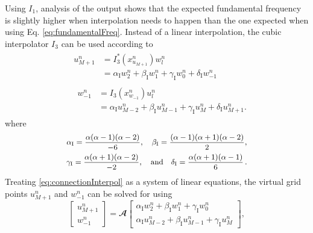 \documentclass[dvipsnames, reprint]{JASA}
\begin{document}
Using $I_1$, analysis of the output shows that the expected fundamental frequency is slightly higher when interpolation needs to happen than the one expected when using Eq. \eqref{eq:fundamentalFreq}. Instead of a linear interpolation, the cubic interpolator $I_3$ can be used according to 
\begin{subequations}\label{eq:connectionInterpol}
\begin{align}
    &\begin{aligned}\label{eq:calcUMP1}
        u_{M+1}^n &= I_3^*(x^n_{u_{M+1}})w_l^n\\
        &= \alpha_\text{I}w_2^n + \beta_\text{I}w_1^n + \gamma_\text{I}w_0^n + \delta_\text{I} w_{-1}^n
    \end{aligned}\\
    &\ \ \begin{aligned}\label{eq:calcWM1}
        w_{-1}^n &= I_3(x^n_{w_{-1}})u_l^n \\
        &=\alpha_\text{I} u_{M-2}^n + \beta_\text{I}u_{M-1}^n+ \gamma_\text{I}u_M^n + \delta_\text{I} u_{M+1}^n.
    \end{aligned}
\end{align}
\end{subequations}
where
\begin{equation}\small
\begin{gathered}\label{eq:interpolationCoeffs}
    \alpha_\text{I} = \frac{\alpha(\alpha - 1)(\alpha - 2)}{-6}, \quad \beta_\text{I} = \frac{(\alpha - 1)(\alpha + 1)(\alpha - 2)}{2},\\
    \gamma_\text{I} = \frac{\alpha(\alpha + 1)(\alpha - 2)}{-2}, \quad \text{and} \quad\delta_\text{I} = \frac{\alpha(\alpha + 1)(\alpha - 1)}{6}\,.
\end{gathered}
\end{equation}
Treating \eqref{eq:connectionInterpol} as a system of linear equations, the virtual grid points $u_{M+1}^n$ and $w_{-1}^n$ can be solved for using
\begin{equation}\label{eq:linSystSolution}
    \begin{bmatrix}
    u_{M+1}^n \\
    w_{-1}^n
    \end{bmatrix}
    =
    \mathbfcal{A}\begin{bmatrix}
    \alpha_\text{I} w_2^n+ \beta_\text{I}w_1^n + \gamma_\text{I}w_0^n \\
    \alpha_\text{I} u_{M-2}^n + \beta_\text{I}u_{M-1}^n + \gamma_\text{I} u_{M}^n
    \end{bmatrix},
\end{equation}
\end{document}
